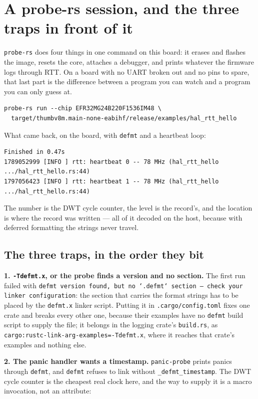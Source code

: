 \section{A probe-rs session, and the three traps in front of it}
\label{sec:a-probe-rs-session}

\texttt{probe-rs} does four things in one command on this board: it erases and flashes the image, resets the core, attaches
a debugger, and prints whatever the firmware logs through RTT. On a board with no UART broken out and no pins to spare,
that last part is the difference between a program you can watch and a program you can only guess at.

\begin{verbatim}
probe-rs run --chip EFR32MG24B220F1536IM48 \
  target/thumbv8m.main-none-eabihf/release/examples/hal_rtt_hello
\end{verbatim}

What came back, on the board, with \texttt{defmt} and a heartbeat loop:

\begin{verbatim}
Finished in 0.47s
1789052999 [INFO ] rtt: heartbeat 0 -- 78 MHz (hal_rtt_hello .../hal_rtt_hello.rs:44)
1797056423 [INFO ] rtt: heartbeat 1 -- 78 MHz (hal_rtt_hello .../hal_rtt_hello.rs:44)
\end{verbatim}

The number is the DWT cycle counter, the level is the record's, and the location is where the record was written --- all of
it decoded on the host, because with deferred formatting the strings never travel.

\subsection{The three traps, in the order they bit}

\textbf{1. \texttt{-Tdefmt.x}, or the probe finds a version and no section.} The first run failed with
\texttt{defmt version found, but no `.defmt` section --- check your linker configuration}: the section that carries the
format strings has to be placed by the \texttt{defmt.x} linker script. Putting it in \texttt{.cargo/config.toml} fixes
one crate and breaks every other one, because their examples have no \texttt{defmt} build script to supply the file; it
belongs in the logging crate's \texttt{build.rs}, as
\texttt{cargo:rustc-link-arg-examples=-Tdefmt.x}, where it reaches that crate's examples and nothing else.

\textbf{2. The panic handler wants a timestamp.} \texttt{panic-probe} prints panics through \texttt{defmt}, and
\texttt{defmt} refuses to link without \texttt{\_defmt\_timestamp}. The DWT cycle counter is the cheapest real clock
here, and the way to supply it is a macro invocation, not an attribute:

